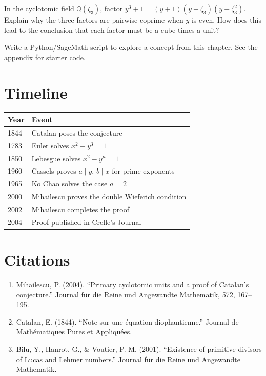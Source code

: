 \begin{exercise}
In the cyclotomic field $\mathbb{Q}(\zeta_3)$, factor $y^3 + 1 = (y+1)(y+\zeta_3)(y+\zeta_3^2)$. Explain why the three factors are pairwise coprime when $y$ is even. How does this lead to the conclusion that each factor must be a cube times a unit?
\end{exercise}


\begin{exercise}[Computational]
Write a Python/SageMath script to explore a concept from this chapter. See the appendix for starter code.
\end{exercise}

\section{Timeline}

\begin{tabularx}{\linewidth}{lX}
\toprule
\textbf{Year} & \textbf{Event} \\ \midrule
1844 & Catalan poses the conjecture \\ 
1783 & Euler solves $x^2 - y^3 = 1$ \\ 
1850 & Lebesgue solves $x^2 - y^n = 1$ \\ 
1960 & Cassels proves $a \mid y$, $b \mid x$ for prime exponents \\ 
1965 & Ko Chao solves the case $a = 2$ \\ 
2000 & Mihailescu proves the double Wieferich condition \\ 
2002 & Mihailescu completes the proof \\ 
2004 & Proof published in Crelle's Journal \\ \bottomrule
\end{tabularx}

\section{Citations}

\begin{enumerate}
\item Mihailescu, P. (2004). ``Primary cyclotomic units and a proof of Catalan's conjecture.'' Journal f\"ur die Reine und Angewandte Mathematik, 572, 167--195.
\item Catalan, E. (1844). ``Note sur une \'equation diophantienne.'' Journal de Math\'ematiques Pures et Appliqu\'ees.
\item Bilu, Y., Hanrot, G., \& Voutier, P. M. (2001). ``Existence of primitive divisors of Lucas and Lehmer numbers.'' Journal f\"ur die Reine und Angewandte Mathematik.
\end{enumerate}
